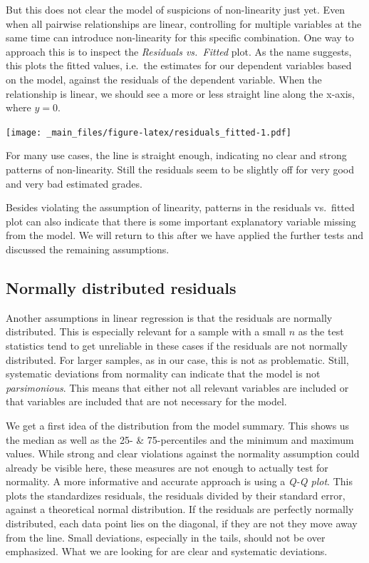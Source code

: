 \documentclass[
]{book}
\begin{document}
But this does not clear the model of suspicions of non-linearity just yet. Even when all pairwise relationships are linear, controlling for multiple variables at the same time can introduce non-linearity for this specific combination. One way to approach this is to inspect the \emph{Residuals vs.~Fitted} plot. As the name suggests, this plots the fitted values, i.e.~the estimates for our dependent variables based on the model, against the residuals of the dependent variable. When the relationship is linear, we should see a more or less straight line along the x-axis, where \(y = 0\).

\texttt{[image: \_main\_files/figure-latex/residuals\_fitted-1.pdf]}

For many use cases, the line is straight enough, indicating no clear and strong patterns of non-linearity. Still the residuals seem to be slightly off for very good and very bad estimated grades.

Besides violating the assumption of linearity, patterns in the residuals vs.~fitted plot can also indicate that there is some important explanatory variable missing from the model. We will return to this after we have applied the further tests and discussed the remaining assumptions.

\hypertarget{normally-distributed-residuals}{%
\subsection{Normally distributed residuals}\label{normally-distributed-residuals}}

Another assumptions in linear regression is that the residuals are normally distributed. This is especially relevant for a sample with a small \(n\) as the test statistics tend to get unreliable in these cases if the residuals are not normally distributed. For larger samples, as in our case, this is not as problematic. Still, systematic deviations from normality can indicate that the model is not \emph{parsimonious}. This means that either not all relevant variables are included or that variables are included that are not necessary for the model.

We get a first idea of the distribution from the model summary. This shows us the median as well as the 25- \& 75-percentiles and the minimum and maximum values. While strong and clear violations against the normality assumption could already be visible here, these measures are not enough to actually test for normality. A more informative and accurate approach is using a \emph{Q-Q plot}. This plots the standardizes residuals, the residuals divided by their standard error, against a theoretical normal distribution. If the residuals are perfectly normally distributed, each data point lies on the diagonal, if they are not they move away from the line. Small deviations, especially in the tails, should not be over emphasized. What we are looking for are clear and systematic deviations.
\end{document}
